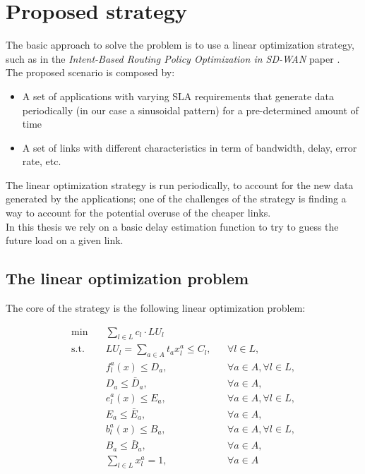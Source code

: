 \documentclass{article}
\begin{document}
	\section{Proposed strategy}
	The basic approach to solve the problem is to use a linear optimization strategy, such as in the  \textit{Intent-Based Routing Policy Optimization in SD-WAN} paper \cite{intent_based_routing}. \\
	The proposed scenario is composed by:
	\begin{itemize}
		\item A set of applications with varying SLA requirements that generate data periodically (in our case a sinusoidal pattern) for a pre-determined amount of time
		\item A set of links with different characteristics in term of bandwidth, delay, error rate, etc.
	\end{itemize}
	The linear optimization strategy is run periodically, to account for the new data generated by the applications; one of the challenges of the strategy is finding a way to account for the potential overuse of the cheaper links. \\
	In this thesis we rely on a basic delay estimation function to try to guess the future load on a given link.

	
 
	
	\subsection{The linear optimization problem}
	The core of the strategy is the following linear optimization problem:
	\begin{center}
		\begin{align}
			\min & \quad \sum_{l \in L} c_l \cdot LU_l  \tag{1}
			\label{eq:objective}
			\\
			\text{s.t.} 
			& \quad LU_l = \sum_{a \in A} t_a x^a_l \leq C_l, 
			&& \forall l \in L, \tag{2} \label{eq:2} \\			
			& \quad f^a_l(x) \leq D_a, 
			&& \forall a \in A, \forall l \in L, \tag{3} \label{eq:3} \\	
			& \quad D_a \leq \bar{D}_a, 
			&& \forall a \in A, \tag{4} \label{eq:4} \\	
			& \quad e^a_l(x) \leq E_a, 
			&& \forall a \in A, \forall l \in L, \tag{5}  \label{eq:5} \\	
			& \quad E_a \leq \bar{E}_a, 
			&& \forall a \in A, \tag{6}  \label{eq:6} \\	
			& \quad b^a_l(x) \leq B_a, 
			&& \forall a \in A, \forall l \in L, \tag{7}  \label{eq:7} \\	
			& \quad B_a \leq \bar{B}_a, 
			&& \forall a \in A, \tag{8}  \label{eq:8} \\	
			& \quad \sum_{l \in L} x^a_l = 1, 
			&& \forall a \in A \tag{9}  \label{eq:9}
		\end{align}
	\end{center}
	
\end{document}
